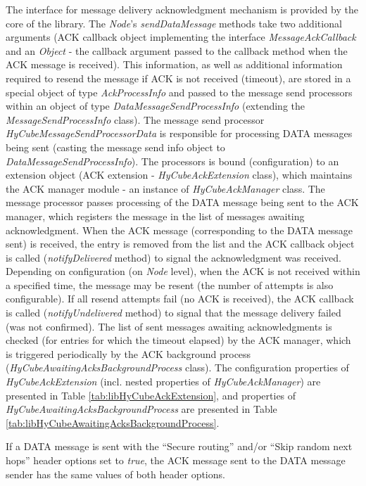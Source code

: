 The interface for message delivery acknowledgment mechanism is provided by the core of the library. The \emph{Node}'s \emph{sendDataMessage} methods take two additional arguments (ACK callback object implementing the interface \emph{MessageAckCallback} and an \emph{Object} - the callback argument passed to the callback method when the ACK message is received). This information, as well as additional information required to resend the message if ACK is not received (timeout), are stored in a special object of type \emph{AckProcessInfo} and passed to the message send processors within an object of type \emph{DataMessageSendProcessInfo} (extending the \emph{MessageSendProcessInfo} class). The message send processor \emph{HyCubeMessageSendProcessorData} is responsible for processing DATA messages being sent (casting the message send info object to \emph{DataMessageSendProcessInfo}). The processors is bound (configuration) to an extension object (ACK extension - \emph{HyCubeAckExtension} class), which maintains the ACK manager module - an instance of \emph{HyCubeAckManager} class. The message processor passes processing of the DATA message being sent to the ACK manager, which registers the message in the list of messages awaiting acknowledgment. When the ACK message (corresponding to the DATA message sent) is received, the entry is removed from the list and the ACK callback object is called (\emph{notifyDelivered} method) to signal the acknowledgment was received. Depending on configuration (on \emph{Node} level), when the ACK is not received within a specified time, the message may be resent (the number of attempts is also configurable). If all resend attempts fail (no ACK is received), the ACK callback is called (\emph{notifyUndelivered} method) to signal that the message delivery failed (was not confirmed). The list of sent messages awaiting acknowledgments is checked (for entries for which the timeout elapsed) by the ACK manager, which is triggered periodically by the ACK background process (\emph{HyCubeAwaitingAcksBackgroundProcess} class).
The configuration properties of \emph{HyCubeAckExtension} (incl. nested properties of \emph{HyCubeAckManager}) are presented in Table \ref{tab:libHyCubeAckExtension},  and properties of \emph{HyCubeAwaitingAcksBackgroundProcess} are presented in Table \ref{tab:libHyCubeAwaitingAcksBackgroundProcess}.

If a DATA message is sent with the ``Secure routing'' and/or ``Skip random next hops'' header options set to \emph{true}, the ACK message sent to the DATA message sender has the same values of both header options.



